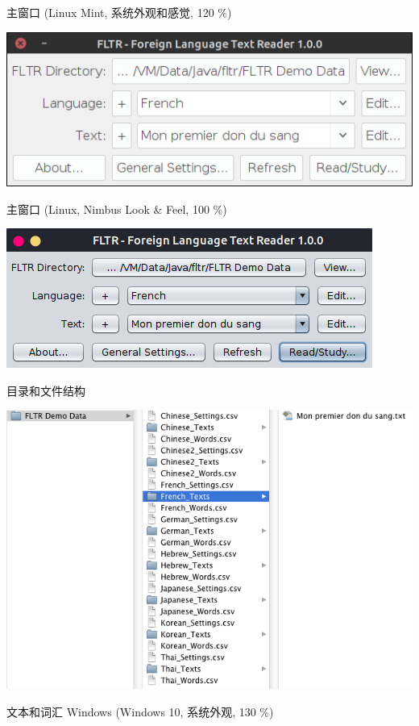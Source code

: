 \documentclass[cn,10pt,math=newtx,citestyle=gb7714-2015,bibstyle=gb7714-2015]{elegantbook}
\begin{document}
主窗口 (Linux Mint, 系统外观和感觉, 120 \%)

\includegraphics[scale=0.8]{image/images-007.png}


主窗口 (Linux, Nimbus Look \& Feel, 100 \%)

\includegraphics[scale=0.8]{image/images-009.png}


目录和文件结构

\includegraphics[scale=0.5]{image/images-011.png}

文本和词汇 Windows (Windows 10, 系统外观, 130 \%)
\end{document}
